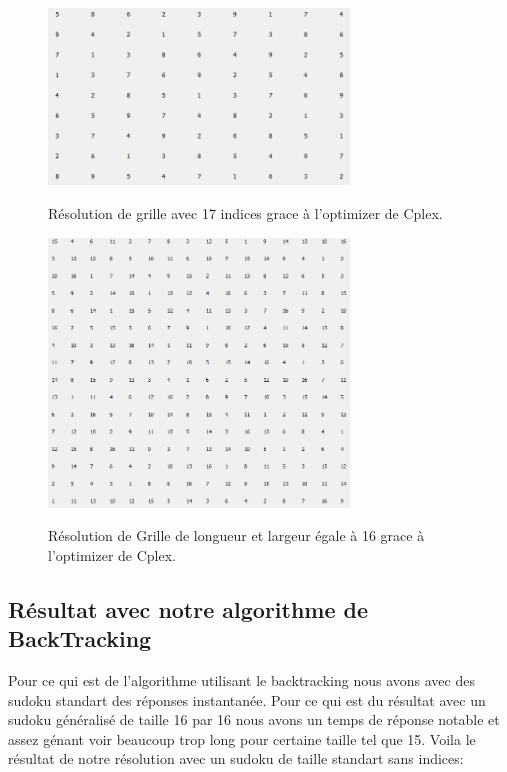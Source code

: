 \begin{figure}[h]
  \begin{center}
\includegraphics[width=8cm]{./images/Res_17.png}\label{Test_Cplex_17}
\caption{Résolution de grille avec 17 indices grace à l'optimizer de Cplex.}
\end{center}
\end{figure}


\begin{figure}[h]
  \begin{center}
\includegraphics[width=8cm]{./images/Resultat_16_Cplex.png}\label{Test_Cplex_16_16}
\caption{Résolution de Grille de longueur et largeur égale à 16 grace à l'optimizer de Cplex.}
\end{center}
\end{figure}
\newpage
\subsection{Résultat avec notre algorithme de BackTracking}
Pour ce qui est de l'algorithme utilisant le backtracking nous avons avec des sudoku standart des réponses instantanée. Pour ce qui est du résultat avec un sudoku généralisé de taille 16 par 16 nous avons un temps de réponse notable et assez génant voir beaucoup trop long pour certaine taille tel que 15.\newline
Voila le résultat de notre résolution avec un sudoku de taille standart sans indices:

